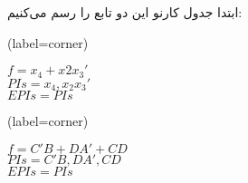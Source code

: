 ابتدا جدول کارنو این دو تابع را رسم می‌کنیم:


\begin{latin}
	\begin{minipage}{0.48\textwidth}
		\centering
		\begin{karnaugh-map}[4][4][1][$x_2$][$x_1$][$x_4$][$x_3$](label=corner)
		\end{karnaugh-map}

		$f=x_4+x2x_3'$\\
		$PIs=x_4, x_2x_3'$\\
		$EPIs=PIs$\\
	\end{minipage}
	\hfill
	\begin{minipage}{0.48\textwidth}
		\centering
		\begin{karnaugh-map}[4][4][1][$B$][$A$][$D$][$C$](label=corner)
		\end{karnaugh-map}

		$f=C'B+DA'+CD$\\
		$PIs=C'B,DA',CD$\\
		$EPIs=PIs$\\
	\end{minipage}	
\end{latin}

